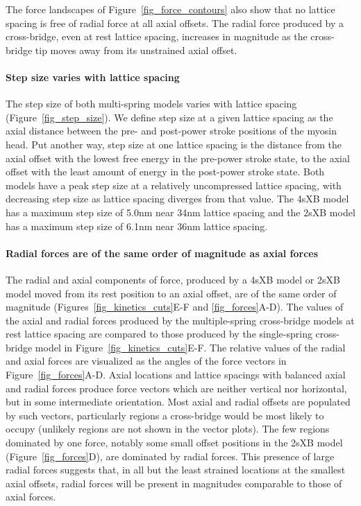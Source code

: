 \documentclass[10pt]{article}
\begin{document}
The force landscapes of Figure~\ref{fig_force_contours} also show that no lattice spacing is free of radial force at all axial offsets.  
The radial force produced by a cross-bridge, even at rest lattice spacing, increases in magnitude as the cross-bridge tip moves away from its unstrained axial offset. 

\paragraph{Step size varies with lattice spacing} %
The step size of both multi-spring models varies with lattice spacing (Figure~\ref{fig_step_size}). 
We define step size at a given lattice spacing as the axial distance between the pre- and post-power stroke positions of the myosin head. 
Put another way, step size at one lattice spacing is the distance from the axial offset with the lowest free energy in the pre-power stroke state, to the axial offset with the least amount of energy in the post-power stroke state. 
Both models have a peak step size at a relatively uncompressed lattice spacing, with decreasing step size as lattice spacing diverges from that value. 
The 4sXB model has a maximum step size of 5.0nm near 34nm lattice spacing and the 2sXB model has a maximum step size of 6.1nm near 36nm lattice spacing. 

\paragraph{Radial forces are of the same order of magnitude as axial forces} %
The radial and axial components of force, produced by a 4sXB model or 2sXB model moved from its rest position to an axial offset, are of the same order of magnitude (Figures~\ref{fig_kinetics_cuts}E-F and \ref{fig_forces}A-D). 
The values of the axial and radial forces produced by the multiple-spring cross-bridge models at rest lattice spacing are compared to those produced by the single-spring cross-bridge model in Figure~\ref{fig_kinetics_cuts}E-F.
The relative values of the radial and axial forces are visualized as the angles of the force vectors in Figure~\ref{fig_forces}A-D. 
Axial locations and lattice spacings with balanced axial and radial forces produce force vectors which are neither vertical nor horizontal, but in some intermediate orientation.
Most axial and radial offsets are populated by such vectors, particularly regions a cross-bridge would be most likely to occupy (unlikely regions are not shown in the vector plots). 
The few regions dominated by one force, notably some small offset positions in the 2sXB model (Figure~\ref{fig_forces}D), are dominated by radial forces.
This presence of large radial forces suggests that, in all but the least strained locations at the smallest axial offsets, radial forces will be present in magnitudes comparable to those of axial forces. 
\end{document}
